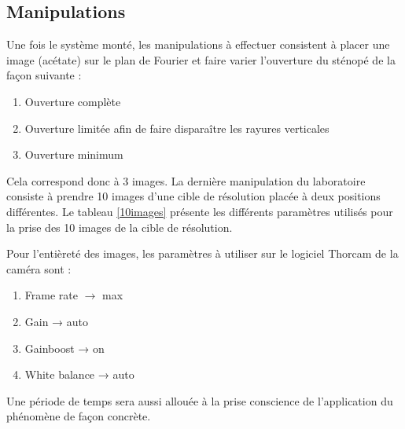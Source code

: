\documentclass[11pt,letterpaper]{article}
\begin{document}
\subsection{Manipulations}

Une fois le système monté, les manipulations à effectuer consistent à placer une image (acétate) sur le plan de Fourier et faire varier l'ouverture du sténopé de la façon suivante : 

\begin{enumerate}
    \item Ouverture complète
    \item Ouverture limitée afin de faire disparaître les rayures verticales
    \item Ouverture minimum
\end{enumerate}

Cela correspond donc à 3 images. La dernière manipulation du laboratoire consiste à prendre 10 images d'une cible de résolution placée à deux positions différentes. Le tableau \ref{10images} présente les différents paramètres utilisés pour la prise des 10 images de la cible de résolution. 

\begin{table}[h!]
\centering
{}
\caption{Tableau des paramètres utilisés pour la prise des 10 images}
\label{10images}
\end{table}

Pour l'entièreté des images, les paramètres à utiliser sur le logiciel Thorcam de la caméra sont : 

\begin{enumerate}
    \item Frame rate $\rightarrow$ max
    \item Gain → auto
    \item Gainboost → on
    \item White balance → auto
\end{enumerate}

Une période de temps sera aussi allouée à la prise conscience de l'application du phénomène de façon concrète. 
\end{document}
